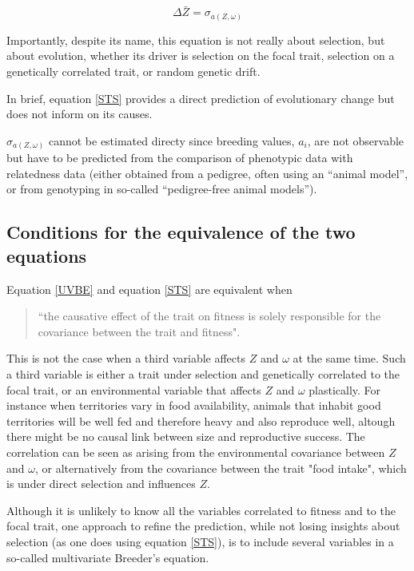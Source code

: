 \begin{equation}
\Delta \bar{Z}= \sigma_{a(Z,\omega)}
\label{STS}
\end{equation}

Importantly, despite its name, this equation is not really about selection, but about evolution, whether its driver is selection on the focal trait, selection on a genetically correlated trait, or random genetic drift.


In brief, equation \ref{STS} provides a direct prediction of evolutionary change but does not inform on its causes.

$\sigma_{a(Z,\omega)}$ cannot be estimated directy since breeding values, $a_i$, are not observable but have to be predicted from the comparison of phenotypic data with relatedness data (either obtained from a pedigree, often using an ``animal model'', or from genotyping in so-called ``pedigree-free animal models''). 

\subsection{Conditions for the equivalence of the two equations}

Equation \ref{UVBE} and equation \ref{STS} are equivalent when

\begin{quote}
``the causative effect of the trait on fitness is solely responsible for the covariance between the trait and fitness".\end{quote} 

This is not the case when a third variable affects $Z$ and $\omega$ at the same time. Such a third variable is either a trait under selection and genetically correlated to the focal trait, or an environmental variable that affects $Z$ and $\omega$ plastically. For instance when territories vary in food availability, animals that inhabit good territories will be well fed and therefore heavy and also reproduce well, altough there might be no causal link between size and reproductive success. The correlation can be seen as arising from the environmental covariance between $Z$ and $\omega$, or alternatively from the covariance between the trait "food intake", which is under direct selection and influences $Z$.  

Although it is unlikely to know all the variables correlated to fitness and to the focal trait, one approach to refine the prediction, while not losing insights about selection (as one does using equation \ref{STS}), is to include several variables in a so-called multivariate Breeder's equation.  

